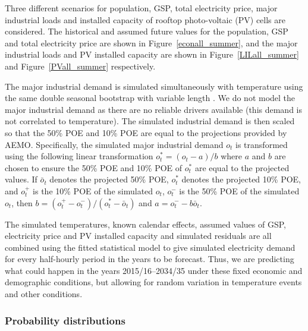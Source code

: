 \documentclass[11pt]{article}
\begin{document}
Three different scenarios for population, GSP, total electricity price, major industrial loads and installed capacity of rooftop photo-voltaic (PV) cells are considered.
The historical and assumed future values for the population, GSP and total electricity price are shown in Figure~\ref{econall_summer}, and the major industrial loads and PV installed capacity are shown in Figure~\ref{LILall_summer} and Figure~\ref{PVall_summer} respectively.




The major industrial demand is simulated simultaneously with temperature using the same double seasonal bootstrap with variable length \citep{Tech15}. We do not model the major industrial demand as there are no reliable drivers available (this demand is not correlated to temperature). The simulated industrial demand is then scaled so that the 50\% POE and 10\% POE are equal to the projections provided by AEMO.
Specifically, the simulated major industrial demand $o_{t}$ is transformed using the following linear transformation
$o^*_{t} = (o_{t}-a)/b$ where $a$ and $b$ are chosen to ensure the 50\% POE and 10\% POE of $o^*_{t}$ are equal to the projected values. If $\bar{o}_t$ denotes the projected 50\% POE, $o^*_t$ denotes the projected 10\% POE, and $o_t^+$ is the 10\% POE of the simulated $o_{t}$, $o_t^-$ is the 50\% POE of the simulated $o_{t}$,
then $b = (o^+_t - o^-_t)/(o^*_t-\bar{o}_t)$ and $a = o^-_t - b\bar{o}_t$.

The simulated temperatures, known calendar effects, assumed values of GSP, electricity price and PV installed capacity and simulated residuals are all combined using the fitted statistical model to give simulated electricity demand for every half-hourly period in the years to be forecast. Thus, we are predicting what could happen in the years 2015/16--2034/35 under these fixed economic and demographic conditions, but allowing for random variation in temperature events and other conditions.


\subsubsection{Probability distributions}
\end{document}
